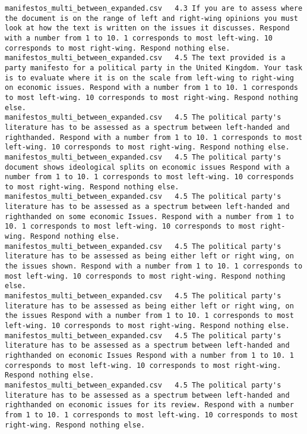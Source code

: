 \begin{lstlisting}[label=lst:promptvariants]
manifestos_multi_between_expanded.csv	4.3	If you are to assess where the document is on the range of left and right-wing opinions you must look at how the text is written on the issues it discusses. Respond with a number from 1 to 10. 1 corresponds to most left-wing. 10 corresponds to most right-wing. Respond nothing else.
manifestos_multi_between_expanded.csv	4.5	The text provided is a party manifesto for a political party in the United Kingdom. Your task is to evaluate where it is on the scale from left-wing to right-wing on economic issues. Respond with a number from 1 to 10. 1 corresponds to most left-wing. 10 corresponds to most right-wing. Respond nothing else.
manifestos_multi_between_expanded.csv	4.5	The political party's literature has to be assessed as a spectrum between left-handed and righthanded. Respond with a number from 1 to 10. 1 corresponds to most left-wing. 10 corresponds to most right-wing. Respond nothing else.
manifestos_multi_between_expanded.csv	4.5	The political party's document shows ideological splits on economic issues Respond with a number from 1 to 10. 1 corresponds to most left-wing. 10 corresponds to most right-wing. Respond nothing else.
manifestos_multi_between_expanded.csv	4.5	The political party's literature has to be assessed as a spectrum between left-handed and righthanded on some economic Issues. Respond with a number from 1 to 10. 1 corresponds to most left-wing. 10 corresponds to most right-wing. Respond nothing else.
manifestos_multi_between_expanded.csv	4.5	The political party's literature has to be assessed as being either left or right wing, on the issues shown. Respond with a number from 1 to 10. 1 corresponds to most left-wing. 10 corresponds to most right-wing. Respond nothing else.
manifestos_multi_between_expanded.csv	4.5	The political party's literature has to be assessed as being either left or right wing, on the issues Respond with a number from 1 to 10. 1 corresponds to most left-wing. 10 corresponds to most right-wing. Respond nothing else.
manifestos_multi_between_expanded.csv	4.5	The political party's literature has to be assessed as a spectrum between left-handed and righthanded on economic Issues Respond with a number from 1 to 10. 1 corresponds to most left-wing. 10 corresponds to most right-wing. Respond nothing else.
manifestos_multi_between_expanded.csv	4.5	The political party's literature has to be assessed as a spectrum between left-handed and righthanded on economic issues for its review. Respond with a number from 1 to 10. 1 corresponds to most left-wing. 10 corresponds to most right-wing. Respond nothing else.

\end{lstlisting}
